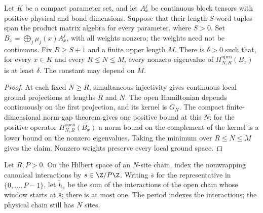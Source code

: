 \begin{lemma}
    \label{thm:compact_bounded_open_interval_gap}
    \leanok
    Let $K$ be a compact parameter set, and let $A_x^j$ be continuous
    block tensors with positive physical and bond dimensions. Suppose that
    their length-$S$ word tuples span the product matrix algebra for every
    parameter, where $S>0$. Set $B_x=\bigoplus_j\mu_j(x)A_x^j$, with
    all weights nonzero; the weights need not be continuous.
    Fix $R\geq S+1$ and a finite upper length $M$.
    There is $\delta>0$ such that, for every $x\in K$ and every
    $R\leq N\leq M$, every nonzero eigenvalue of
    $H^{\mathrm{open}}_{N,R}(B_x)$ is at least $\delta$.
    The constant may depend on $M$.
\end{lemma}
\begin{proof}\leanok
    At each fixed $N\geq R$, simultaneous injectivity gives continuous
    local ground projections at lengths $R$ and $N$. The open Hamiltonian
    depends continuously on the first projection, and its kernel is $G_N$.
    The compact finite-dimensional norm-gap theorem gives one positive
    bound at this $N$; for the positive operator
    $H^{\mathrm{open}}_{N,R}(B_x)$ a norm bound on the complement of the
    kernel is a lower bound on the nonzero eigenvalues. Taking the minimum over $R\leq N\leq M$ gives the
    claim. Nonzero weights preserve every local ground space.
\end{proof}

\begin{definition}
    \label{def:open_knabe_padding}
    Let $R,P>0$. On the Hilbert space of an $N$-site chain, index the
    nonwrapping canonical interactions by $s\in\Z/P\Z$. Writing $\bar s$
    for the representative in $\{0,\ldots,P-1\}$, let $\widetilde h_s$ be
    the sum of the interactions of the open chain whose window starts at
    $\bar s$; there is at most one. The period indexes the interactions; the
    physical chain still has $N$ sites.
\end{definition}

